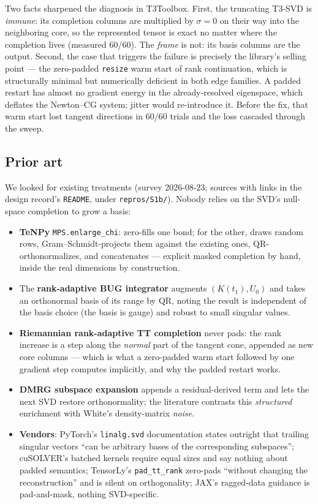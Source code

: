 \documentclass[11pt]{article}
\theoremstyle{definition}
\theoremstyle{remark}
\newcommand{\code}[1]{\texttt{#1}}
\begin{document}
Two facts sharpened the diagnosis in T3Toolbox. First, the truncating T3-SVD is \emph{immune}: its
completion columns are multiplied by $\sigma=0$ on their way into the neighboring core, so the
represented tensor is exact no matter where the completion lives (measured 60/60). The
\emph{frame} is not: its basis columns are the output. Second, the case that triggers the failure
is precisely the library's selling point --- the zero-padded \code{resize} warm start of rank
continuation, which is structurally minimal but numerically deficient in both edge families. A
padded restart has almost no gradient energy in the already-resolved eigenspace, which deflates the
Newton--CG system; jitter would re-introduce it. Before the fix, that warm start lost tangent
directions in 60/60 trials and the loss cascaded through the sweep.

\subsection{Prior art}\label{sec:prior}

We looked for existing treatments (survey 2026-08-23; sources with links in the design record's
\code{README}, under \code{repros/S1b/}). Nobody relies on the SVD's null-space completion to grow
a basis:

\begin{itemize}[itemsep=2pt]
\item \textbf{TeNPy} \code{MPS.enlarge\_chi}: zero-fills one bond; for the other, draws random rows,
Gram--Schmidt-projects them against the existing ones, QR-orthonormalizes, and concatenates ---
explicit masked completion by hand, inside the real dimensions by construction.
\item The \textbf{rank-adaptive BUG integrator} \cite{CerutiKuschLubich2022} augments $(K(t_1),U_0)$
and takes an orthonormal basis of its range by QR, noting the result is independent of the basis
choice (the basis is gauge) and robust to small singular values.
\item \textbf{Riemannian rank-adaptive TT completion} \cite{VermeylenVandereyckenAbsil2024} never
pads: the rank increase is a step along the \emph{normal} part of the tangent cone, appended as new
core columns --- which is what a zero-padded warm start followed by one gradient step computes
implicitly, and why the padded restart works.
\item \textbf{DMRG subspace expansion} \cite{Hubig2015} appends a residual-derived term and lets the
next SVD restore orthonormality; the literature contrasts this \emph{structured} enrichment with
White's density-matrix \emph{noise}.
\item \textbf{Vendors}: PyTorch's \code{linalg.svd} documentation states outright that trailing
singular vectors ``can be arbitrary bases of the corresponding subspaces''; cuSOLVER's batched
kernels require equal sizes and say nothing about padded semantics; TensorLy's \code{pad\_tt\_rank}
zero-pads ``without changing the reconstruction'' and is silent on orthogonality; JAX's ragged-data
guidance is pad-and-mask, nothing SVD-specific.
\end{itemize}
\end{document}
